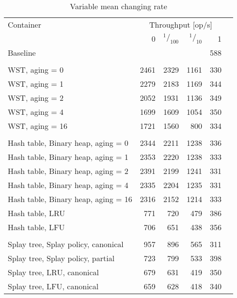 \begin{table}
\caption{Variable mean changing rate}
\begin{tabular}[]{l r r r r r} \toprule
Container & \multicolumn{4}{c}{Throughput [op/s]} \\ \cmidrule(r){2-5}
& 0 & $^1/_{100}$ & $^1/_{10}$ & 1 \\ \midrule
Baseline & \multicolumn{4}{r}{588}  \\
\\
WST, aging = 0 & 2461 & 2329 & 1161 & 330 \\
WST, aging = 1 & 2279 & 2183 & 1169 & 344 \\
WST, aging = 2 & 2052 & 1931 & 1136 & 349 \\
WST, aging = 4 & 1699 & 1609 & 1054 & 350 \\
WST, aging = 16 & 1721 & 1560 & 800 & 334 \\
\\
Hash table, Binary heap, aging = 0 & 2344 & 2211 & 1238 & 336 \\
Hash table, Binary heap, aging = 1 & 2353 & 2220 & 1238 & 333 \\
Hash table, Binary heap, aging = 2 & 2391 & 2199 & 1241 & 331 \\
Hash table, Binary heap, aging = 4 & 2335 & 2204 & 1235 & 331 \\
Hash table, Binary heap, aging = 16 & 2316 & 2152 & 1214 & 333 \\
Hash table, LRU & 771 & 720 & 479 & 386 \\
Hash table, LFU & 706 & 651 & 438 & 356 \\
\\
Splay tree, Splay policy, canonical & 957 & 896 & 565 & 311 \\
Splay tree, Splay policy, partial & 723 & 799 & 533 & 398 \\
Splay tree, LRU, canonical & 679 & 631 & 419 & 350 \\
Splay tree, LFU, canonical & 659 & 628 & 418 & 340 \\
\bottomrule
\end{tabular}
\end{table}
